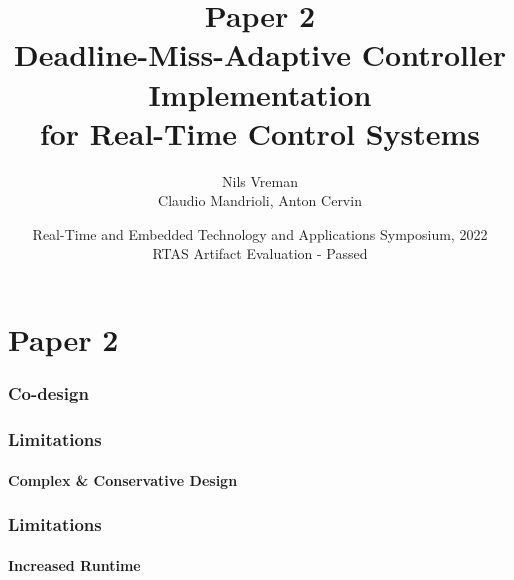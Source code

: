 \section{Paper 2}

\title[PhD Defence]{
    {\Huge Paper 2} \\
    \vspace{2mm}
    {\Large Deadline-Miss-Adaptive Controller Implementation} \\
    {\Large for Real-Time Control Systems}
}
\author[Nils Vreman]{
    Nils Vreman \\
    \vspace{3mm}
    {\large Claudio Mandrioli, Anton Cervin}
}
\date[RTAS 2022]{
    Real-Time and Embedded Technology and Applications Symposium, 2022\\
    {\large RTAS Artifact Evaluation - Passed}
}
\notitlelogo
{}

\begin{frame}
    \frametitle{Co-design}
    \vspace{-1.5cm}%
    \begin{figure}[h]
    \end{figure}
\end{frame}

\begin{frame}
    \frametitle{Limitations}
    \framesubtitle{Complex \& Conservative Design}
    \begin{figure}
        \centerline{\resizebox{0.65\textwidth}{!}{}}
    \end{figure}
\end{frame}

\begin{frame}
    \frametitle{Limitations}
    \framesubtitle{Increased Runtime}
    \begin{figure}
        \centerline{\resizebox{0.55\textwidth}{!}{}}
    \end{figure}
\end{frame}


